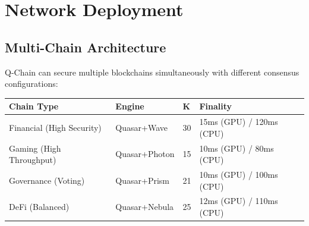 \section{Network Deployment}


\subsection{Multi-Chain Architecture}

Q-Chain can secure multiple blockchains simultaneously with different consensus configurations:

\begin{table}[h]
\centering
\small
\begin{tabular}{@{}llll@{}}
\toprule
\textbf{Chain Type} & \textbf{Engine} & \textbf{K} & \textbf{Finality} \\
\midrule
Financial (High Security) & Quasar+Wave & 30 & 15ms (GPU) / 120ms (CPU) \\
Gaming (High Throughput) & Quasar+Photon & 15 & 10ms (GPU) / 80ms (CPU) \\
Governance (Voting) & Quasar+Prism & 21 & 10ms (GPU) / 100ms (CPU) \\
DeFi (Balanced) & Quasar+Nebula & 25 & 12ms (GPU) / 110ms (CPU) \\
\bottomrule
\end{tabular}

\label{tab:configurations}
\end{table}

